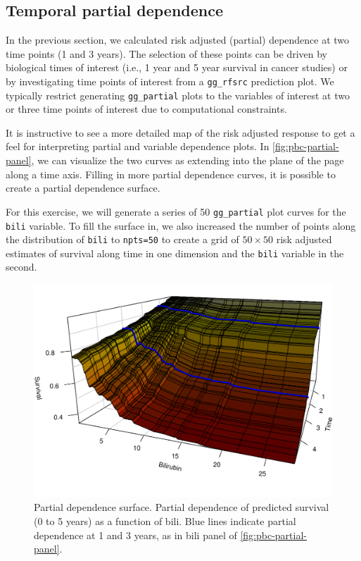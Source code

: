 \documentclass[article]{jss}
\begin{document}
\subsection{Temporal partial
dependence}\label{temporal-partial-dependence}

In the previous section, we calculated risk adjusted (partial)
dependence at two time points (1 and 3 years). The selection of these
points can be driven by biological times of interest (i.e., 1 year and 5
year survival in cancer studies) or by investigating time points of
interest from a \texttt{gg\_rfsrc} prediction plot. We typically
restrict generating \texttt{gg\_partial} plots to the variables of
interest at two or three time points of interest due to computational
constraints.

It is instructive to see a more detailed map of the risk adjusted
response to get a feel for interpreting partial and variable dependence
plots. In \autoref{fig:pbc-partial-panel}, we can visualize the two
curves as extending into the plane of the page along a time axis.
Filling in more partial dependence curves, it is possible to create a
partial dependence surface.

For this exercise, we will generate a series of 50 \texttt{gg\_partial}
plot curves for the \texttt{bili} variable. To fill the surface in, we
also increased the number of points along the distribution of
\texttt{bili} to \texttt{npts=50} to create a grid of \(50 \times 50\)
risk adjusted estimates of survival along time in one dimension and the
\texttt{bili} variable in the second.

\begin{Schunk}
\begin{figure}[!htb]

{\centering \includegraphics{rfs-timeSurface3d-1} 

}

\caption{Partial dependence surface. Partial dependence of predicted survival (0 to 5 years) as a function of bili. Blue lines indicate partial dependence at 1 and 3 years, as in bili panel of \autoref{fig:pbc-partial-panel}.}\label{fig:timeSurface3d}
\end{figure}
\end{Schunk}
\end{document}
